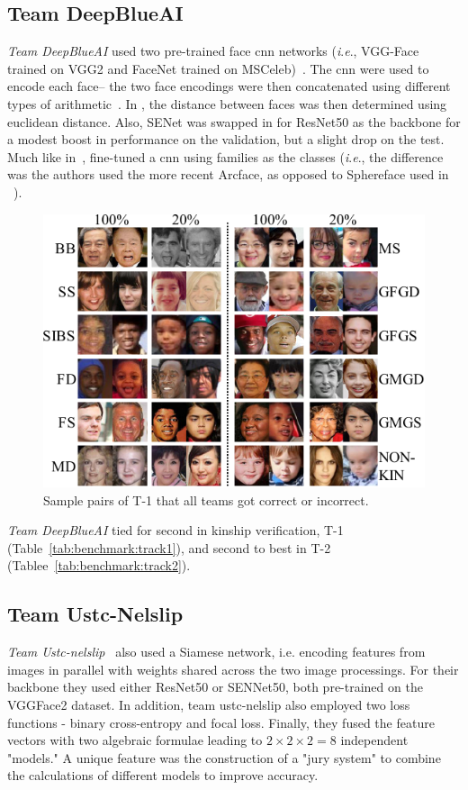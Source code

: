 \documentclass[letterpaper, 10 pt, conference]{ieeeconf}  %
\newcommand{\ie}{\textit{i}.\textit{e}., }
\begin{document}
\subsection{Team DeepBlueAI}
\emph{Team DeepBlueAI} used two pre-trained face \acs{cnn} networks (\ie VGG-Face trained on VGG2 and FaceNet trained on MSCeleb)~\cite{id3}. The \acs{cnn} were used to encode each face-- the two face encodings were then concatenated using different types of arithmetic~\cite{id6, id8}. In \cite{id3}, the distance between faces was then determined using euclidean distance. Also, SENet was swapped in for ResNet50 as the backbone for a modest boost in performance on the validation, but a slight drop on the test. Much like in~\cite{robinson2018visual}, \cite{id3} fine-tuned a \ac{cnn} using families as the classes (\ie the difference was the authors used the more recent Arcface, as opposed to Sphereface used in ~\cite{robinson2018visual}).
\begin{figure}[t!]
    \centering
    \includegraphics[width =.9\linewidth]{figures/track1-samples-submitted-crop.pdf}
    \caption{Sample pairs of T-1 that all teams got correct or incorrect.}
    \label{fig:track1:samples:submitted}
    \vspace{-6mm}
\end{figure}

\emph{Team DeepBlueAI} tied for second in kinship verification, T-1 (Table~\ref{tab:benchmark:track1}), and second to best in T-2 (Tablee~\ref{tab:benchmark:track2}).

\subsection{Team Ustc-Nelslip}
\emph{Team Ustc-nelslip}~\cite{id6} also used a Siamese network, i.e. encoding features from images in parallel with weights shared across the two image processings. For their backbone they used either ResNet50 or SENNet50, both pre-trained on the VGGFace2 dataset. In addition, team ustc-nelslip also employed two loss functions - binary cross-entropy and focal loss. Finally, they fused the feature vectors with two algebraic formulae leading to \( 2 \times 2 \times 2 = 8 \) independent "models." A unique feature was the construction of a "jury system" to combine the calculations of different models to improve accuracy.
\end{document}
